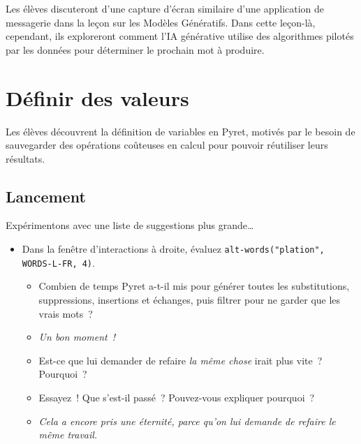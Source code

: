 \documentclass[12pt,a4paper]{article}
\begin{document}
\begin{instructornotes}
  Les élèves discuteront d'une capture d'écran similaire d'une application de messagerie dans la leçon sur les Modèles Génératifs. Dans cette leçon-là, cependant, ils exploreront comment l'IA générative utilise des algorithmes pilotés par les données pour déterminer le prochain mot à produire.
\end{instructornotes}

\newpage

\section{Définir des valeurs}

\begin{overviewbox}
  Les élèves découvrent la définition de variables en Pyret, motivés par le besoin de sauvegarder des opérations coûteuses en calcul pour pouvoir réutiliser leurs résultats.
\end{overviewbox}

\subsection{Lancement}

\begin{activitybox}
  Expérimentons avec une liste de suggestions plus grande\ldots{}

  \begin{itemize}
    \item Dans la fenêtre d'interactions à droite, évaluez \texttt{alt-words("plation", WORDS-L-FR, 4)}.
    \begin{itemize}
      \item Combien de temps Pyret a-t-il mis pour générer toutes les substitutions, suppressions, insertions et échanges, puis filtrer pour ne garder que les vrais mots~?
      \item \emph{Un bon moment~!}
      \item Est-ce que lui demander de refaire \emph{la même chose} irait plus vite~? Pourquoi~?
      \item Essayez~! Que s'est-il passé~? Pouvez-vous expliquer pourquoi~?
      \item \emph{Cela a encore pris une éternité, parce qu'on lui demande de refaire le même travail.}
    \end{itemize}
  \end{itemize}
\end{activitybox}
\end{document}
